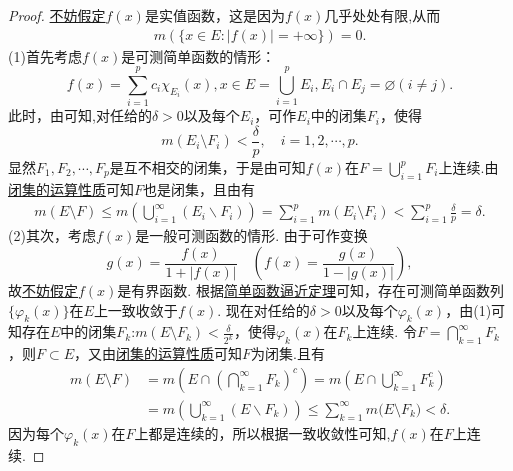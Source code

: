 \documentclass[../../main.tex]{subfiles}
\begin{document}
\begin{proof}
\hyperlink{不妨假定f是实值函数的原因}{不妨假定}\(f(x)\)是实值函数，这是因为$f(x)$几乎处处有限,从而
\begin{align*}
m(\{x \in E: |f(x)| = +\infty\}) = 0.
\end{align*}
(1)首先考虑\(f(x)\)是可测简单函数的情形：
\[f(x) = \sum_{i = 1}^{p} c_{i} \chi_{E_{i}}(x), x \in E = \bigcup_{i = 1}^{p} E_{i}, E_{i} \cap E_{j} = \varnothing (i \neq j).\]
此时，由可知,对任给的\(\delta > 0\)以及每个\(E_{i}\)，可作\(E_{i}\)中的闭集\(F_{i}\)，使得
\[m(E_{i} \setminus F_{i}) < \frac{\delta}{p}, \quad i = 1,2,\cdots,p.\]
显然\(F_{1},F_{2},\cdots,F_{p}\)是互不相交的闭集，于是由可知\(f(x)\)在\(F = \bigcup_{i = 1}^{p} F_{i}\)上连续.由\hyperref[theorem:闭集的运算性质]{闭集的运算性质}可知\(F\)也是闭集，且由有
\begin{align*}
m(E \setminus F) \leqslant m(\bigcup_{i=1}^{\infty}(E_i\backslash F_i))=\sum_{i = 1}^{p} m(E_{i} \setminus F_{i}) < \sum_{i = 1}^{p} \frac{\delta}{p} = \delta.
\end{align*}
(2)其次，考虑\(f(x)\)是一般可测函数的情形. 由于可作变换
\[g(x) = \frac{f(x)}{1 + |f(x)|} \quad \left(f(x) = \frac{g(x)}{1 - |g(x)|}\right),\]
故\hyperlink{不妨设f有界的原因}{不妨假定}\(f(x)\)是有界函数. 根据\hyperref[theorem:简单函数逼近定理]{简单函数逼近定理}可知，存在可测简单函数列\(\{\varphi_{k}(x)\}\)在\(E\)上一致收敛于\(f(x)\). 现在对任给的\(\delta > 0\)以及每个\(\varphi_{k}(x)\)，由(1)可知存在\(E\)中的闭集\(F_{k}\):\(m(E \setminus F_{k}) < \frac{\delta}{2^{k}}\)，使得\(\varphi_{k}(x)\)在\(F_{k}\)上连续. 令\(F = \bigcap_{k = 1}^{\infty} F_{k}\)，则\(F \subset E\)，又由\hyperref[theorem:闭集的运算性质]{闭集的运算性质}可知$F$为闭集.且有
\begin{align*}
m(E\setminus F)&=m(E\cap \left( \bigcap_{k=1}^{\infty}{F_k} \right) ^c)=m(E\cap \bigcup_{k=1}^{\infty}{F_{k}^{c}})
\\
&=m(\bigcup_{k=1}^{\infty}{\left( E\backslash F_k \right)})\leqslant \sum_{k=1}^{\infty}{m(E}\setminus F_k)<\delta .
\end{align*}
因为每个\(\varphi_{k}(x)\)在\(F\)上都是连续的，所以根据一致收敛性可知,\(f(x)\)在\(F\)上连续. 

\end{proof}
\end{document}
